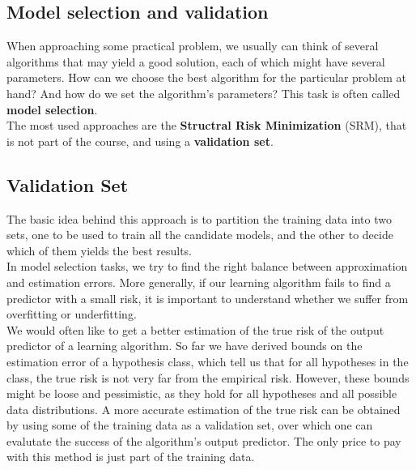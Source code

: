 \documentclass[12pt]{report}
\theoremstyle{plain}
\begin{document}
\begin{flushleft}
\chapter{Model selection and validation}
When approaching some practical problem, we usually can think of several 
algorithms that may yield a good solution, each of which might have several 
parameters. How can we choose the best algorithm for the particular problem at 
hand? And how do we set the algorithm’s parameters? This task is often called 
\textbf{model selection}.\\
The most used approaches are the \textbf{Structral Risk Minimization} (SRM), 
that is not part of the course, and using a \textbf{validation set}.\\

\section{Validation Set}
The basic idea behind this approach is to partition the training data into two 
sets, one to be used to train all the candidate models, and the other to decide 
which of them yields the best results.\\
In model selection tasks, we try to find the right balance between 
approximation and estimation errors. More generally, if our learning algorithm 
fails to find a predictor with a small risk, it is important to understand 
whether we suffer from overfitting or underfitting.\\
We would often like to get a better estimation of the true risk of the output 
predictor of a learning algorithm. So far we have derived bounds on the 
estimation error of a hypothesis class, which tell us that for all hypotheses 
in the class, the true risk is not very far from the empirical risk. However, 
these bounds might be loose and pessimistic, as they hold for all hypotheses 
and all possible data distributions. A more accurate estimation of the true 
risk can be obtained by using some of the training data as a validation set, 
over which one can evalutate the success of the algorithm’s output predictor.
The only price to pay with this method is just part of the training data.\\


\end{flushleft}
\end{document}
